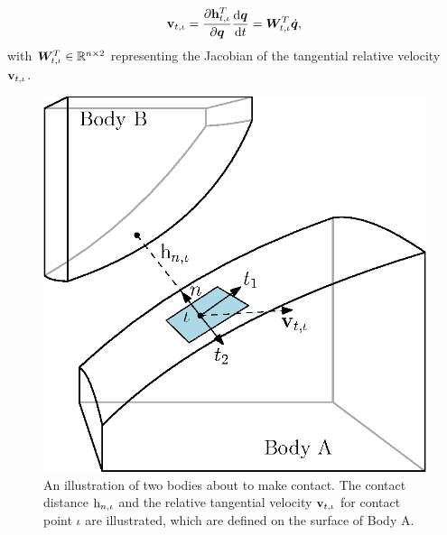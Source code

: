 \documentclass[../DC2017114Bouma.tex]{subfiles}
\begin{document}
\begin{align}
\mathbf{v}_{t,\iota} = \frac{\partial \mathbf{h}^T_{t,\iota}}{\partial{\boldsymbol{q}}}\frac{\text{d}{\boldsymbol{q}}}{\text{d} t} = {\boldsymbol{W}}_{t,\iota}^T\dot{{\boldsymbol{q}}},
\end{align}
with ${\boldsymbol{W}}^T_{t,\iota}\in\mathbb{R}^{n\times 2}$ representing the Jacobian of the tangential relative velocity $\mathbf{v}_{t,\iota}$.
\begin{figure}[bt!]
\centering
\includegraphics[width=.5\textwidth]{contactplanes2.eps}\caption{An illustration of two bodies about to make contact. The contact distance $\mathrm{h}_{n,\iota}$ and the relative tangential velocity $\mathbf{v}_{t,\iota}$ for contact point $\iota$ are illustrated, which are defined on the surface of Body A.} \label{fig:contactplanes}
\end{figure}
\end{document}

